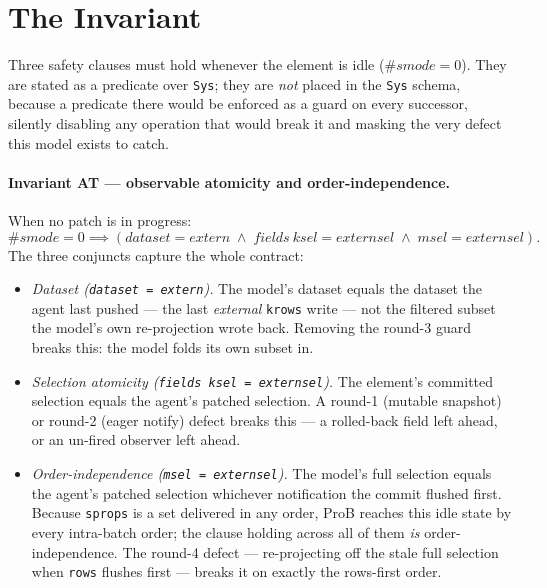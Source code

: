 \documentclass[a4paper,10pt,fleqn]{article}
\begin{document}
\section{The Invariant}
\label{sec:inv}

Three safety clauses must hold whenever the element is idle ($\# smode = 0$).
They are stated as a predicate over \texttt{Sys}; they are \emph{not} placed in
the \texttt{Sys} schema, because a predicate there would be enforced as a guard on
every successor, silently disabling any operation that would break it and masking
the very defect this model exists to catch.

\paragraph{Invariant AT --- observable atomicity and order-independence.}
When no patch is in progress:
\[
  \# smode = 0 \implies
  (dataset = extern \; \land \; fields~ksel = externsel \; \land \;
   msel = externsel).
\]
The three conjuncts capture the whole contract:

\begin{itemize}
  \item \emph{Dataset (\texttt{dataset = extern}).}  The model's dataset equals
    the dataset the agent last pushed --- the last \emph{external} \texttt{krows}
    write --- not the filtered subset the model's own re-projection wrote back.
    Removing the round-3 guard breaks this: the model folds its own subset in.
  \item \emph{Selection atomicity (\texttt{fields~ksel = externsel}).}  The
    element's committed selection equals the agent's patched selection.  A round-1
    (mutable snapshot) or round-2 (eager notify) defect breaks this --- a
    rolled-back field left ahead, or an un-fired observer left ahead.
  \item \emph{Order-independence (\texttt{msel = externsel}).}  The model's full
    selection equals the agent's patched selection whichever notification the
    commit flushed first.  Because \texttt{sprops} is a set delivered in any
    order, ProB reaches this idle state by every intra-batch order; the clause
    holding across all of them \emph{is} order-independence.  The round-4 defect
    --- re-projecting off the stale full selection when \texttt{rows} flushes
    first --- breaks it on exactly the rows-first order.
\end{itemize}
\end{document}
